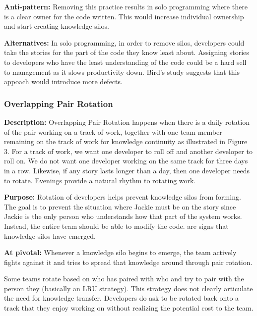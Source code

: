 \begin{table}[]
\textbf{Anti-pattern:} Removing this practice results in solo programming where there is a clear owner for the code written. This would increase individual ownership and start creating knowledge silos. 

\textbf{Alternatives:}  In solo programming, in order to remove silos, developers could take the stories for the part of the code they know least about. Assigning stories to developers who have the least understanding of the code could be a hard sell to management as it slows productivity down. Bird's study \cite{BirdDontTouchMyCode} suggests that this appoach would introduce more defects. 

\subsubsection{Overlapping Pair Rotation}
\textbf{Description:} Overlapping Pair Rotation happens when there is a daily rotation of the pair working on a track of work, together with one team member remaining on the track of work for knowledge continuity as illustrated in Figure 3. For a track of work, we want one developer to roll off and another developer to roll on.  We do not want one developer working on the same track for three days in a row. Likewise, if any story lasts longer than a day, then one developer needs to rotate. Evenings provide a natural rhythm to rotating work. 

\textbf{Purpose:} Rotation of developers helps prevent knowledge silos from forming. The goal is to prevent the situation where Jackie must be on the story since Jackie is the only person who understands how that part of the system works. Instead, the entire team should be able to modify the code.  are signs that knowledge silos have emerged. 

\textbf{At pivotal:} Whenever a knowledge silo begins to emerge, the team actively fights against it and tries to spread that knowledge around through pair rotation. 

Some teams rotate based on who has paired with who and try to pair with the person they  (basically an LRU strategy). This strategy does not clearly articulate the need for knowledge transfer. Developers do ask to be rotated back onto a track that they enjoy working on without realizing the potential cost to the team. 


\end{table}
